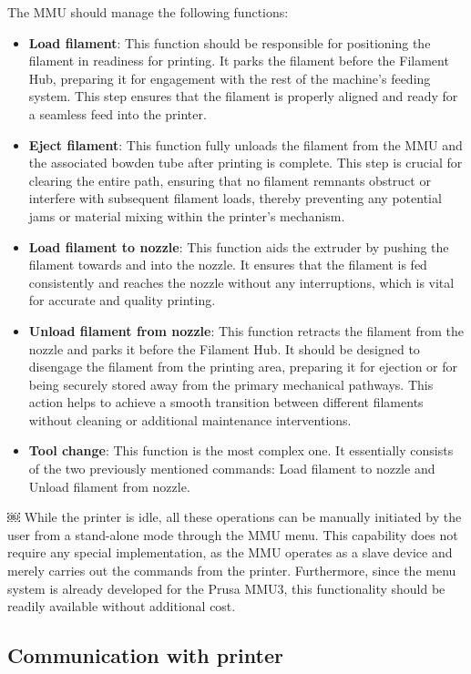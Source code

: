 The MMU should manage the following functions:
\begin{itemize}
    \item \textbf{Load filament}: This function should be responsible for positioning the filament in readiness for printing. It parks the filament before the Filament Hub, preparing it for engagement with the rest of the machine's feeding system. This step ensures that the filament is properly aligned and ready for a seamless feed into the printer.
    \item \textbf{Eject filament}: This function fully unloads the filament from the MMU and the associated bowden tube after printing is complete. This step is crucial for clearing the entire path, ensuring that no filament remnants obstruct or interfere with subsequent filament loads, thereby preventing any potential jams or material mixing within the printer’s mechanism.
    \item \textbf{Load filament to nozzle}: This function aids the extruder by pushing the filament towards and into the nozzle. It ensures that the filament is fed consistently and reaches the nozzle without any interruptions, which is vital for accurate and quality printing.
    \item \textbf{Unload filament from nozzle}: This function retracts the filament from the nozzle and parks it before the Filament Hub. It should be designed to disengage the filament from the printing area, preparing it for ejection or for being securely stored away from the primary mechanical pathways. This action helps to achieve a smooth transition between different filaments without cleaning or additional maintenance interventions.
    \item \textbf{Tool change}: This function is the most complex one. It essentially consists of the two previously mentioned commands: Load filament to nozzle and Unload filament from nozzle.
\end{itemize}
￼
While the printer is idle, all these operations can be manually initiated by the user from a stand-alone mode through the MMU menu. This capability does not require any special implementation, as the MMU operates as a slave device and merely carries out the commands from the printer. Furthermore, since the menu system is already developed for the Prusa MMU3, this functionality should be readily available without additional cost.

\subsection{Communication with printer}


